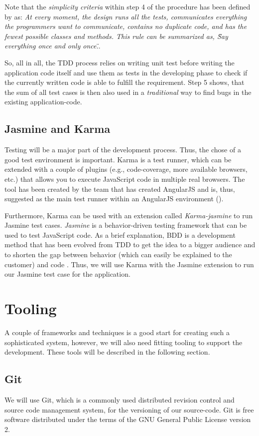 Note that the \textit{simplicity criteria} within step 4 of the procedure has been defined by \cite{Beck1999} as: \textit{At every moment, the design runs all the tests, communicates everything the programmers want to communicate, contains no duplicate code, and has the fewest possible classes and methods. This rule can be summarized as, \"Say everything once and only once.\"}. 

So, all in all, the \ac{TDD} process relies on writing unit test before writing the application code itself and use them as tests in the developing phase to check if the currently written code is able to fulfill the requirement. Step 5 shows, that the sum of all test cases is then also used in a \textit{traditional} way to find bugs in the existing application-code. 

\subsection{Jasmine and Karma}
Testing will be a major part of the development process. Thus, the chose of a good test environment is important. Karma is a test runner, which can be extended with a couple of plugins (e.g., code-coverage, more available browsers, etc.) that allows you to execute JavaScript code in multiple real browsers. The tool has been created by the team that has created AngularJS and is, thus, suggested as the main test runner within an AngularJS environment (\cite{7_github_2015}).  

Furthermore, Karma can be used with an extension called \emph{Karma-jasmine} to run Jasmine test cases. \emph{Jasmine} is a behavior-driven testing framework that can be used to test JavaScript code. As a brief explanation, \ac{BDD} is a development method that has been evolved from \ac{TDD} to get the idea to a bigger audience and to shorten the gap between behavior (which can easily be explained to the customer) and code \cite{BDD}. Thus, we will use Karma with the Jasmine extension to run our Jasmine test case for the application.
 
\section{Tooling}
A couple of frameworks and techniques is a good start for creating such a sophisticated system, however, we will also need fitting tooling to support the development. These tools will be described in the following section.

\subsection{Git}
We will use Git, which is a commonly used distributed revision control and source code management system, for the versioning of our source-code. Git is free software distributed under the terms of the GNU General Public License version 2.

